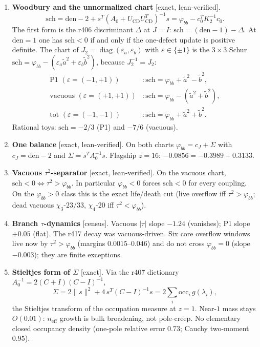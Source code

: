 \documentclass[11pt]{article}
\theoremstyle{remark}
\newcommand{\gr}[1]{\textnormal{\small[#1]}}
\begin{document}
\begin{enumerate}
\item \textbf{Woodbury and the unnormalized chart}
\gr{exact, lean-verified}.
\[
\mathrm{sch}
=\mathrm{den}-2+s^T(A_0+U_{\mathrm{CD}}U_{\mathrm{CD}}^T)^{-1}s
=\varphi_{bb}-c_0^TK_2^{-1}c_0.
\]
The first form is the r406 discriminant $\Delta$ at $J=I$:
$\mathrm{sch}=(\mathrm{den}-1)-\Delta$.  At $\mathrm{den}=1$ one
has $\mathrm{sch}<0$ if and only if the one-defect update is
positive definite.  The chart of $J_2=\operatorname{diag}(\varepsilon_a,\varepsilon_b)$
with $\varepsilon\in\{\pm1\}$ is the $3\times 3$ Schur
$\mathrm{sch}=\varphi_{bb}-(\varepsilon_a\tilde a^2+\varepsilon_b\tilde b^2)$,
because $J_2^{-1}=J_2$:
\begin{align*}
\text{P1 }(\varepsilon=(-1,+1))&\colon
  \mathrm{sch}=\varphi_{bb}+\tilde a^2-\tilde b^2,\\
\text{vacuous }(\varepsilon=(+1,+1))&\colon
  \mathrm{sch}=\varphi_{bb}-(\tilde a^2+\tilde b^2),\\
\text{tot }(\varepsilon=(-1,-1))&\colon
  \mathrm{sch}=\varphi_{bb}+\tilde a^2+\tilde b^2.
\end{align*}
Rational toys: $\mathrm{sch}=-2/3$ (P1) and $-7/6$ (vacuous).

\item \textbf{One balance}
\gr{exact, lean-verified}.
On both charts $\varphi_{bb}=c_J+\Sigma$ with
$c_J=\mathrm{den}-2$ and $\Sigma=s^TA_0^{-1}s$.
Flagship $z=16$: $-0.0856=-0.3989+0.3133$.

\item \textbf{Vacuous $\tau^2$-separator}
\gr{exact, lean-verified}.
On the vacuous chart,
$\mathrm{sch}<0\iff\tau^2>\varphi_{bb}$.  In particular
$\varphi_{bb}<0$ forces $\mathrm{sch}<0$ for every coupling.
On the $\varphi_{bb}>0$ class this is the exact life/death cut
(live overflow iff $\tau^2>\varphi_{bb}$; dead vacuous
$\chi_3$-$23/33$, $\chi_4$-$20$ iff $\tau^2<\varphi_{bb}$).

\item \textbf{Branch $\tau$-dynamics}
\gr{census}.
Vacuous $|\tau|$ slope $-1.24$ (vanishes); P1 slope $+0.05$
(flat).  The r417 decay was vacuous-driven.  Six core overflow
windows live now by $\tau^2>\varphi_{bb}$ (margins
$0.0015$--$0.046$) and do not cross $\varphi_{bb}=0$
(slope $-0.003$); they are finite exceptions.

\item \textbf{Stieltjes form of $\Sigma$}
\gr{exact}.
Via the r407 dictionary $A_0^{-1}=2(C+I)(C-I)^{-1}$,
\[
\Sigma
=2\|s\|^2+4\,s^T(C-I)^{-1}s
=2\sum_i\mathrm{occ}_i\,g(\lambda_i),
\]
the Stieltjes transform of the occupation measure at $z=1$.
Near-$1$ mass stays $O(0.01)$: $n_{\mathrm{eff}}$ growth is bulk
broadening, not pole-creep.  No elementary closed occupancy
density (one-pole relative error $0.73$; Cauchy two-moment
$0.95$).


\end{enumerate}
\end{document}
